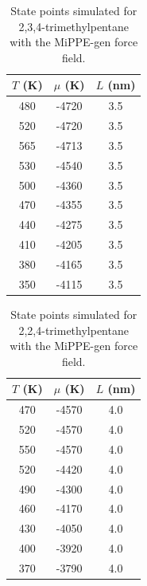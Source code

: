 \documentclass[journal=jctc,manuscript=article]{achemso}
\begin{document}
\begin{table}[htb!]
	\caption{State points simulated for 2,3,4-trimethylpentane with the MiPPE-gen force field.}
	\begin{center}
		\begin{tabular}{|c|c|c|}
			\hline
			$T$ (K) & $\mu$ (K) & $L$ (nm) \\ \hline
			480	&	-4720	&	3.5	\\
			520	&	-4720	&	3.5	\\
			565	&	-4713	&	3.5	\\
			530	&	-4540	&	3.5	\\
			500	&	-4360	&	3.5	\\
			470	&	-4355	&	3.5	\\
			440	&	-4275	&	3.5	\\
			410	&	-4205	&	3.5	\\
			380	&	-4165	&	3.5	\\
			350	&	-4115	&	3.5	\\
			\hline
		\end{tabular}
	\end{center}
\end{table}

\begin{table}[htb!]
	\caption{State points simulated for 2,2,4-trimethylpentane with the MiPPE-gen force field.}
	\begin{center}
		\begin{tabular}{|c|c|c|}
			\hline
			$T$ (K) & $\mu$ (K) & $L$ (nm) \\ \hline
			470	&	-4570	&	4.0	\\
			520	&	-4570	&	4.0	\\
			550	&	-4570	&	4.0	\\
			520	&	-4420	&	4.0	\\
			490	&	-4300	&	4.0	\\
			460	&	-4170	&	4.0	\\
			430	&	-4050	&	4.0	\\
			400	&	-3920	&	4.0	\\
			370	&	-3790	&	4.0	\\
			\hline
		\end{tabular}
	\end{center}
\end{table}
\end{document}
